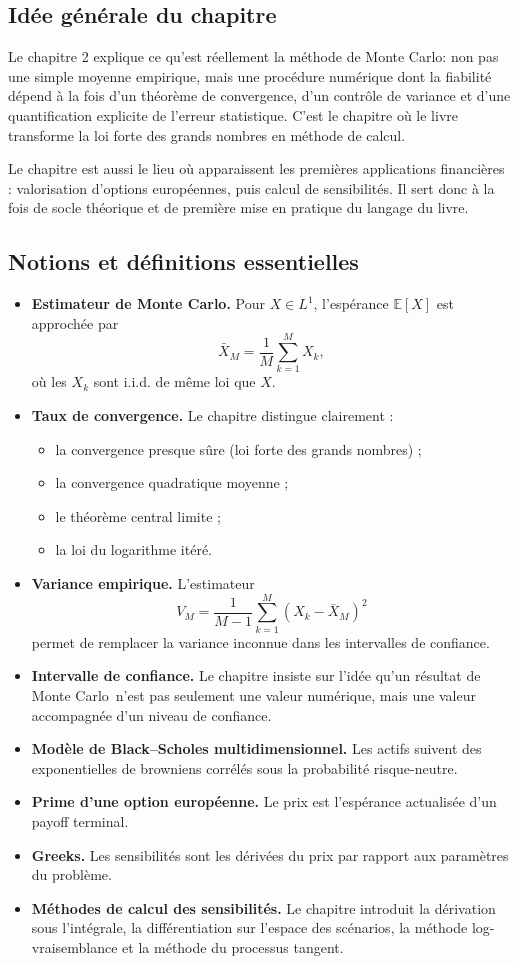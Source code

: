 \documentclass[11pt,a4paper]{article}
\newcommand{\E}{\mathbb{E}}
\newcommand{\mc}{Monte Carlo}
\begin{document}
\subsection{Idée générale du chapitre}

Le chapitre 2 explique ce qu'est réellement la méthode de \mc : non pas une simple moyenne empirique, mais une procédure numérique dont la fiabilité dépend à la fois d'un théorème de convergence, d'un contrôle de variance et d'une quantification explicite de l'erreur statistique. C'est le chapitre où le livre transforme la loi forte des grands nombres en méthode de calcul.

Le chapitre est aussi le lieu où apparaissent les premières applications financières : valorisation d'options européennes, puis calcul de sensibilités. Il sert donc à la fois de socle théorique et de première mise en pratique du langage du livre.

\subsection{Notions et définitions essentielles}

\begin{itemize}
  \item \textbf{Estimateur de \mc.} Pour $X\in L^1$, l'espérance $\E[X]$ est approchée par
  \[
    \bar X_M=\frac1M\sum_{k=1}^M X_k,
  \]
  où les $X_k$ sont i.i.d. de même loi que $X$.
  \item \textbf{Taux de convergence.} Le chapitre distingue clairement :
  \begin{itemize}
    \item la convergence presque sûre (loi forte des grands nombres) ;
    \item la convergence quadratique moyenne ;
    \item le théorème central limite ;
    \item la loi du logarithme itéré.
  \end{itemize}
  \item \textbf{Variance empirique.} L'estimateur
  \[
    V_M=\frac{1}{M-1}\sum_{k=1}^M (X_k-\bar X_M)^2
  \]
  permet de remplacer la variance inconnue dans les intervalles de confiance.
  \item \textbf{Intervalle de confiance.} Le chapitre insiste sur l'idée qu'un résultat de \mc\ n'est pas seulement une valeur numérique, mais une valeur accompagnée d'un niveau de confiance.
  \item \textbf{Modèle de Black--Scholes multidimensionnel.} Les actifs suivent des exponentielles de browniens corrélés sous la probabilité risque-neutre.
  \item \textbf{Prime d'une option européenne.} Le prix est l'espérance actualisée d'un payoff terminal.
  \item \textbf{Greeks.} Les sensibilités sont les dérivées du prix par rapport aux paramètres du problème.
  \item \textbf{Méthodes de calcul des sensibilités.} Le chapitre introduit la dérivation sous l'intégrale, la différentiation sur l'espace des scénarios, la méthode log-vraisemblance et la méthode du processus tangent.
\end{itemize}
\end{document}
